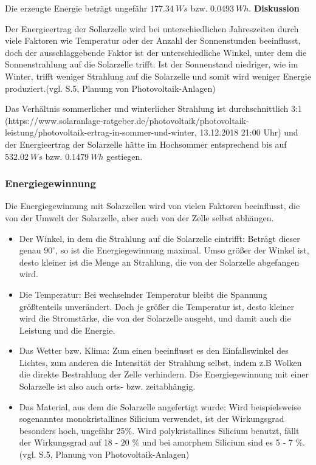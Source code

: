         Die erzeugte Energie beträgt ungefähr $177.34\ Ws$ bzw. $0.0493\ Wh$.
        \vspace{4mm}
        \newline
        \textbf{Diskussion}
        \newline
        \par Der Energieertrag der Sollarzelle wird bei unterschiedlichen Jahreszeiten durch viele Faktoren wie Temperatur oder der Anzahl der Sonnenstunden beeinflusst, doch der ausschlaggebende Faktor ist der unterschiedliche Winkel, unter dem die Sonnenstrahlung auf die Solarzelle trifft. Ist der Sonnenstand niedriger, wie im Winter, trifft weniger Strahlung auf die Solarzelle und somit wird weniger Energie produziert.(vgl. S.5, Planung von Photovoltaik-Anlagen)
        \par Das Verhältnis sommerlicher und winterlicher Strahlung ist durchschnittlich 3:1 (https://www.solaranlage-ratgeber.de/photovoltaik/photovoltaik-leistung/photovoltaik-ertrag-in-sommer-und-winter, 13.12.2018 21:00 Uhr) und der Energieertrag der Solarzelle hätte im Hochsommer entsprechend bis auf $532.02\ Ws$ bzw. $0.1479\ Wh$ gestiegen.
        
    \subsubsection{Energiegewinnung}                                    %
        \par Die Energiegewinnung mit Solarzellen wird von vielen Faktoren beeinflusst, die von der Umwelt der Solarzelle, aber auch von der Zelle selbst abhängen.
        \begin{itemize}
            \item Der Winkel, in dem die Strahlung auf die Solarzelle eintrifft: Beträgt dieser genau $90^{\circ}$, so ist die Energiegewinnung maximal. Umso größer der Winkel ist, desto kleiner ist die Menge an Strahlung, die von der Solarzelle abgefangen wird.
            \item Die Temperatur: Bei wechselnder Temperatur bleibt die Spannung größtenteils unverändert. Doch je größer die Temperatur ist, desto kleiner wird die Stromstärke, die von der Solarzelle ausgeht, und damit auch die Leistung und die Energie.
            \item Das Wetter bzw. Klima: Zum einen beeinflusst es den Einfallswinkel des Lichtes, zum anderen die Intensität der Strahlung selbst, indem z.B Wolken die direkte Bestrahlung der Zelle verhindern. Die Energiegewinnung mit einer Solarzelle ist also auch orts- bzw. zeitabhängig.
            \item Das Material, aus dem die Solarzelle angefertigt wurde: Wird beispielsweise sogenanntes monokristallines Silicium verwendet, ist der Wirkungsgrad besonders hoch, ungefähr 25\%. Wird polykristallines Silicium benutzt, fällt der Wirkungsgrad auf 18 - 20 \% und bei amorphem Silicium sind es 5 - 7 \%. (vgl. S.5, Planung von Photovoltaik-Anlagen)
        \end{itemize}
